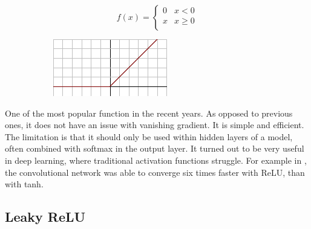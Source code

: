 \begin{figure}[H]
\raggedright
\begin{subfigure}{.35\textwidth}
  \centering
   \[
f(x) = \begin{cases}
       0 & x < 0 \\
       x & x \geq 0 \\
     \end{cases} \]  
\end{subfigure}%
\begin{subfigure}{.25\textwidth}
  \centering
  \includegraphics[width=\textwidth]{tex/images/activation/relu}
\end{subfigure}
\end{figure}

\noindent
One of the most popular function in the recent years. As opposed to previous ones, it does not have an issue with vanishing gradient. It is simple and efficient. The limitation is that it should only be used within hidden layers of a model, often combined with softmax in the output layer. It turned out to be very useful in deep learning, where traditional activation functions struggle. For example in \cite{relu_faster}, the convolutional network was able to converge six times faster with ReLU, than with tanh.

\subsection*{Leaky ReLU}

